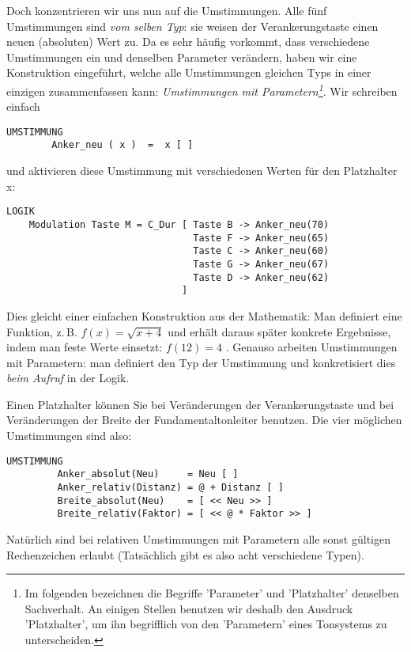 Doch konzentrieren wir uns nun auf die Umstimmungen. Alle fünf
Umstimmungen sind \emph{vom selben Typ}: sie weisen der Verankerungstaste
einen neuen (absoluten) Wert zu. Da es sehr häufig vorkommt, dass
verschiedene Umstimmungen ein und denselben Parameter verändern, haben
wir eine Konstruktion eingeführt, welche alle Umstimmungen gleichen
Typs in einer einzigen zusammenfassen kann: \emph{Umstimmungen mit
Parametern\footnote{Im folgenden bezeichnen die Begriffe 'Parameter' 
und 'Platzhalter' denselben Sachverhalt. An einigen Stellen 
benutzen wir deshalb den Ausdruck 'Platzhalter', um ihn begrifflich 
von den 'Parametern' eines Tonsystems zu unterscheiden.}}. 
Wir schreiben einfach
\begin{verbatim}
UMSTIMMUNG
        Anker_neu ( x )  =  x [ ]
\end{verbatim}
und aktivieren diese Umstimmung mit verschiedenen Werten für den
Platzhalter x:
\begin{verbatim}
LOGIK
    Modulation Taste M = C_Dur [ Taste B -> Anker_neu(70)
                                 Taste F -> Anker_neu(65)
                                 Taste C -> Anker_neu(60)
                                 Taste G -> Anker_neu(67)
                                 Taste D -> Anker_neu(62)
                               ]
\end{verbatim}

Dies gleicht einer einfachen Konstruktion aus der Mathematik: Man
definiert eine Funktion, z.\,B. $ f(x) = \sqrt{x+4} $ und erhält daraus
später konkrete Ergebnisse, indem man feste Werte einsetzt: $ f(12) =
4 $ . Genauso arbeiten Umstimmungen mit Parametern: man definiert den
Typ der Umstimmung und konkretisiert dies \emph{beim
  Aufruf} in der Logik.

Einen Platzhalter können Sie bei Veränderungen der Verankerungstaste
und bei Veränderungen der Breite der Fundamentaltonleiter benutzen.
Die vier möglichen Umstimmungen sind also:

\begin{verbatim}
UMSTIMMUNG
         Anker_absolut(Neu)     = Neu [ ]
         Anker_relativ(Distanz) = @ + Distanz [ ]
         Breite_absolut(Neu)    = [ << Neu >> ]
         Breite_relativ(Faktor) = [ << @ * Faktor >> ]
\end{verbatim}

Natürlich sind bei relativen Umstimmungen mit Parametern alle sonst 
gültigen Rechenzeichen erlaubt (Tatsächlich gibt es also acht 
verschiedene Typen).

